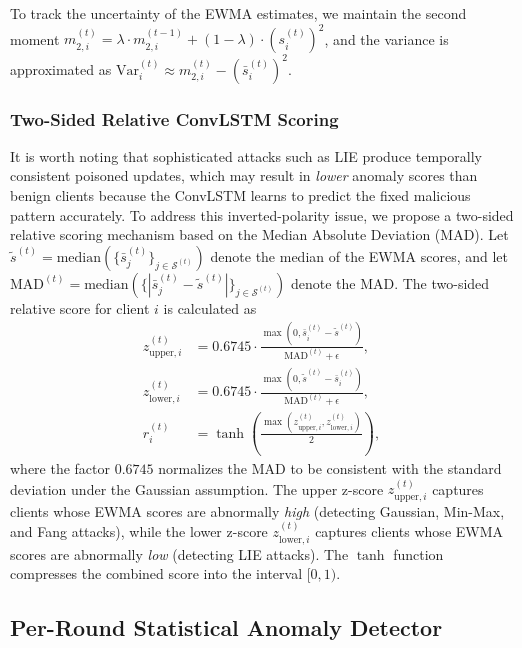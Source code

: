 To track the uncertainty of the EWMA estimates, we maintain the second moment $m_{2,i}^{(t)} = \lambda \cdot m_{2,i}^{(t-1)} + (1 - \lambda) \cdot (s_i^{(t)})^2$, and the variance is approximated as $\text{Var}_i^{(t)} \approx m_{2,i}^{(t)} - (\bar{s}_i^{(t)})^2$.

\subsubsection{Two-Sided Relative ConvLSTM Scoring}

It is worth noting that sophisticated attacks such as LIE produce temporally consistent poisoned updates, which may result in \textit{lower} anomaly scores than benign clients because the ConvLSTM learns to predict the fixed malicious pattern accurately. To address this inverted-polarity issue, we propose a two-sided relative scoring mechanism based on the Median Absolute Deviation (MAD). Let $\tilde{s}^{(t)} = \text{median}(\{\bar{s}_j^{(t)}\}_{j \in \mathcal{S}^{(t)}})$ denote the median of the EWMA scores, and let $\text{MAD}^{(t)} = \text{median}(\{|\bar{s}_j^{(t)} - \tilde{s}^{(t)}|\}_{j \in \mathcal{S}^{(t)}})$ denote the MAD. The two-sided relative score for client $i$ is calculated as
\begin{align}
    z_{\text{upper},i}^{(t)} &= 0.6745 \cdot \frac{\max(0, \bar{s}_i^{(t)} - \tilde{s}^{(t)})}{\text{MAD}^{(t)} + \epsilon}, \label{eq:z_upper} \\
    z_{\text{lower},i}^{(t)} &= 0.6745 \cdot \frac{\max(0, \tilde{s}^{(t)} - \bar{s}_i^{(t)})}{\text{MAD}^{(t)} + \epsilon}, \label{eq:z_lower} \\
    r_i^{(t)} &= \tanh\left(\frac{\max(z_{\text{upper},i}^{(t)}, z_{\text{lower},i}^{(t)})}{2}\right), \label{eq:convlstm_rel}
\end{align}
where the factor $0.6745$ normalizes the MAD to be consistent with the standard deviation under the Gaussian assumption. The upper z-score $z_{\text{upper},i}^{(t)}$ captures clients whose EWMA scores are abnormally \textit{high} (detecting Gaussian, Min-Max, and Fang attacks), while the lower z-score $z_{\text{lower},i}^{(t)}$ captures clients whose EWMA scores are abnormally \textit{low} (detecting LIE attacks). The $\tanh$ function compresses the combined score into the interval $[0, 1)$.

\subsection{Per-Round Statistical Anomaly Detector}\label{subsec:stat_detector}

